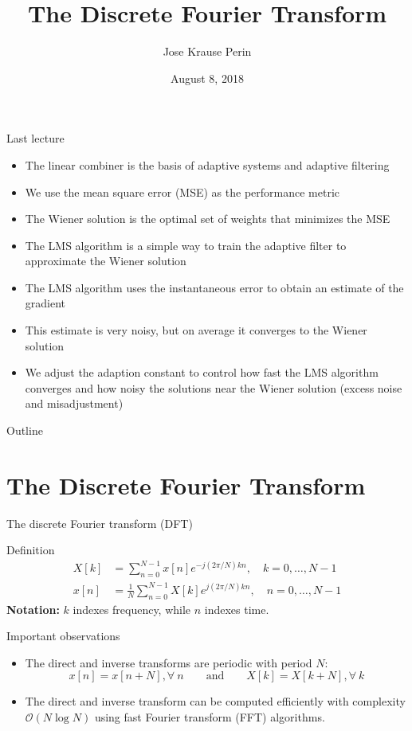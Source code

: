 \documentclass[10pt, aspectratio=169]{beamer}
\title[EE 264]{The Discrete Fourier Transform}
\author{Jose Krause Perin}
\institute{Stanford University}
\date{August 8, 2018}
\begin{document}
\begin{frame}
  \titlepage
\end{frame}

\begin{frame}{Last lecture}
\begin{itemize}
	\item The linear combiner is the basis of adaptive systems and adaptive filtering
	\item We use the mean square error (MSE) as the performance metric
	\item The Wiener solution is the optimal set of weights that minimizes the MSE
	\item The LMS algorithm is a simple way to train the adaptive filter to approximate the Wiener solution
	\item The LMS algorithm uses the instantaneous error to obtain an estimate of the gradient
	\item This estimate is very noisy, but on average it converges to the Wiener solution
	\item We adjust the adaption constant to control how fast the LMS algorithm converges and how noisy the solutions near the Wiener solution (excess noise and misadjustment)
\end{itemize}
\end{frame}

%
\begin{frame}{Outline}
	\tableofcontents
\end{frame}

%
\section{The Discrete Fourier Transform}
\begin{frame}{The discrete Fourier transform (DFT)}
\begin{block}{Definition}
	\vspace{-0.6cm}
	\begin{align}
		X[k] &= \sum_{n = 0}^{N-1}x[n]e^{-j(2\pi/N)kn},\quad k = 0, \ldots, N-1 \tag{direct transform} \\
		x[n] &= \frac{1}{N}\sum_{n = 0}^{N-1}X[k]e^{j(2\pi/N)kn}, \quad n = 0, \ldots, N-1 \tag{inverse transform}
	\end{align}
	\noindent\textbf{Notation:} $k$ indexes frequency, while $n$ indexes time.
\end{block}

\begin{block}{Important observations}
\begin{itemize}
	\item The direct and inverse transforms are periodic with period $N$:
	\begin{equation*}
	x[n] = x[n+N], \forall~n \qquad\text{and}\qquad X[k] = X[k+N], \forall~k
	\end{equation*}
	\item The direct and inverse transform can be computed efficiently with complexity $\mathcal{O}({N\log N})$ using fast Fourier transform (FFT) algorithms.
\end{itemize}
\end{block}
\end{frame}
\end{document}
